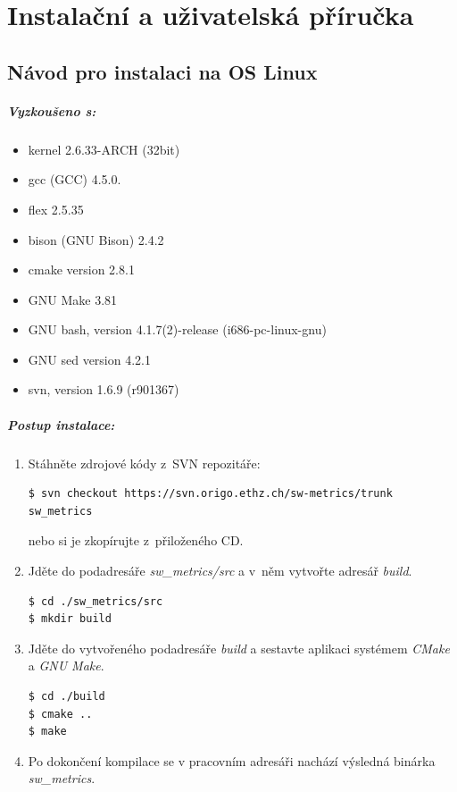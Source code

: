 \documentclass[11pt,twoside,a4paper]{book}
\begin{document}
\chapter{Instalační a uživatelská příručka}

\section{Návod pro instalaci na OS Linux}

\paragraph{Vyzkoušeno s:}
\begin{itemize}
 \item kernel 2.6.33-ARCH (32bit)
 \item gcc (GCC) 4.5.0.
 \item flex 2.5.35
 \item bison (GNU Bison) 2.4.2
 \item cmake version 2.8.1
 \item GNU Make 3.81
 \item GNU bash, version 4.1.7(2)-release (i686-pc-linux-gnu)
 \item GNU sed version 4.2.1
 \item svn, version 1.6.9 (r901367)
\end{itemize}

\paragraph{Postup instalace:}
\begin{enumerate}
 \item Stáhněte zdrojové kódy z~SVN repozitáře:
\begin{verbatim}
$ svn checkout https://svn.origo.ethz.ch/sw-metrics/trunk sw_metrics
\end{verbatim}
nebo si je zkopírujte z~přiloženého CD.
 \item Jděte do podadresáře \textit{sw\_metrics/src} a v~něm vytvořte adresář \textit{build}.
\begin{verbatim}
$ cd ./sw_metrics/src
$ mkdir build
\end{verbatim}
 \item Jděte do vytvořeného podadresáře \textit{build} a sestavte aplikaci systémem \textit{CMake} a \textit{GNU Make}.
\begin{verbatim}
$ cd ./build
$ cmake ..
$ make
\end{verbatim}
 \item Po dokončení kompilace se v pracovním adresáři nachází výsledná binárka \textit{sw\_metrics}.

\end{enumerate}
\end{document}
